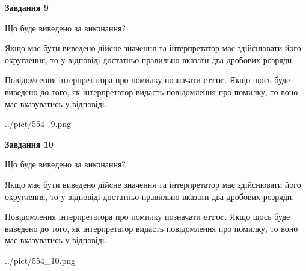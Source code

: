 \documentclass[12pt, ukrainian]{article}
\begin{document}
{\begin {Large}
{\begin {center}\textbf{Завдання 9}\end {center}}\par
Що буде виведено за виконання? \par

Якщо має бути виведено дійсне значення та інтерпретатор має здійснювати його округлення, 
то у відповіді достатньо правильно вказати два дробових розряди.

Повідомлення інтерпретатора про помилку позначати \textbf{error}.
Якщо щось буде виведено до того, як інтерпретатор видасть повідомлення про помилку, 
то воно має вказуватись у відповіді. \par

\begin{center}
	{../pict/554_9.png}
\end{center}
\newpage

{\begin {center}\textbf{Завдання 10}\end {center}}\par
Що буде виведено за виконання? \par

Якщо має бути виведено дійсне значення та інтерпретатор має здійснювати його округлення, 
то у відповіді достатньо правильно вказати два дробових розряди.

Повідомлення інтерпретатора про помилку позначати \textbf{error}.
Якщо щось буде виведено до того, як інтерпретатор видасть повідомлення про помилку, 
то воно має вказуватись у відповіді. \par

\begin{center}
	{../pict/554_10.png}
\end{center}
\newpage

\end {Large}}
\end{document}

